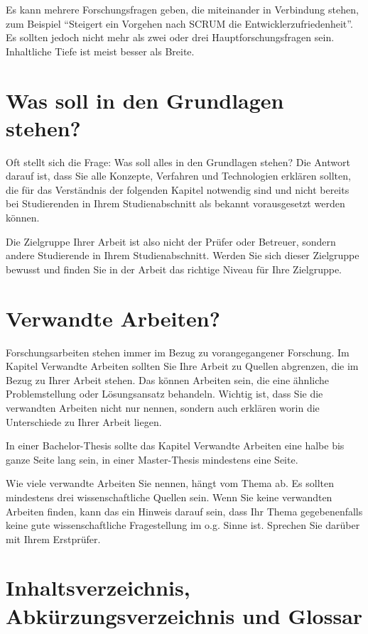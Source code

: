 Es kann mehrere Forschungsfragen geben, die miteinander in Verbindung stehen, zum Beispiel \enquote{Steigert ein Vorgehen nach SCRUM die Entwicklerzufriedenheit}. Es sollten jedoch nicht mehr als zwei oder drei Hauptforschungsfragen sein. Inhaltliche Tiefe ist meist besser als Breite.


\section{Was soll in den Grundlagen stehen?}

Oft stellt sich die Frage: Was soll alles in den Grundlagen stehen? Die Antwort darauf ist, dass Sie alle Konzepte, Verfahren und Technologien erklären sollten, die für das Verständnis der folgenden Kapitel notwendig sind und nicht bereits bei Studierenden in Ihrem Studienabschnitt als  bekannt vorausgesetzt werden können.

Die Zielgruppe Ihrer Arbeit ist also nicht der Prüfer oder Betreuer, sondern andere Studierende in Ihrem Studienabschnitt. Werden Sie sich dieser Zielgruppe bewusst und finden Sie in der Arbeit das richtige Niveau für Ihre Zielgruppe.

\section{Verwandte Arbeiten?}
\label{sec:verwandte-arbeiten}

Forschungsarbeiten stehen immer im Bezug zu vorangegangener Forschung. Im Kapitel Verwandte Arbeiten sollten Sie Ihre Arbeit zu Quellen abgrenzen, die im Bezug zu Ihrer Arbeit stehen. Das können Arbeiten sein, die eine ähnliche Problemstellung oder Lösungsansatz behandeln. Wichtig ist, dass Sie die verwandten Arbeiten nicht nur nennen, sondern auch erklären worin die Unterschiede zu Ihrer Arbeit liegen.

In einer Bachelor-Thesis sollte das Kapitel Verwandte Arbeiten eine halbe bis ganze Seite lang sein, in einer Master-Thesis mindestens eine Seite.

Wie viele verwandte Arbeiten Sie nennen, hängt vom Thema ab. Es sollten mindestens drei wissenschaftliche Quellen sein. Wenn Sie keine verwandten Arbeiten finden, kann das ein Hinweis darauf sein, dass Ihr Thema gegebenenfalls keine gute wissenschaftliche Fragestellung im o.g. Sinne ist. Sprechen Sie darüber mit Ihrem Erstprüfer.

\section{Inhaltsverzeichnis, Abkürzungsverzeichnis und Glossar}
\label{sec:inhaltsverzeichnis-und-glossar}

